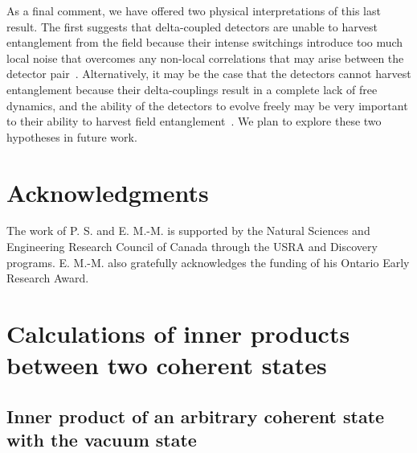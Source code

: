 \documentclass[pra,nofootinbib,floats,aps,twocolumn,tightenlines,superscriptaddress]{revtex4-1}
\begin{document}
As a final comment, we have offered two physical interpretations of this last result. The first suggests that delta-coupled detectors are unable to harvest entanglement from the field because their intense switchings introduce too much local noise that overcomes any non-local correlations that may arise between the detector pair~\cite{Reznik2005,Pozas2015}. Alternatively, it may be the case that the detectors cannot harvest entanglement because their delta-couplings result in a complete lack of free dynamics, and the ability of the detectors to evolve freely may be very important to their ability to harvest field entanglement~\cite{Pozas2017}. We plan to explore these two hypotheses in future work.%


\section*{Acknowledgments}
	
The work of P. S. and E. M.-M. is supported by the Natural Sciences and Engineering Research Council of Canada through the USRA and Discovery programs. E. M.-M. also gratefully acknowledges the funding of his Ontario Early Research Award.
	

\onecolumngrid
\appendix


\section{Calculations of inner products between two coherent states}
\label{Appendix:coherent_inner_product}


\subsection{Inner product of an arbitrary coherent state with the vacuum state}
\end{document}
